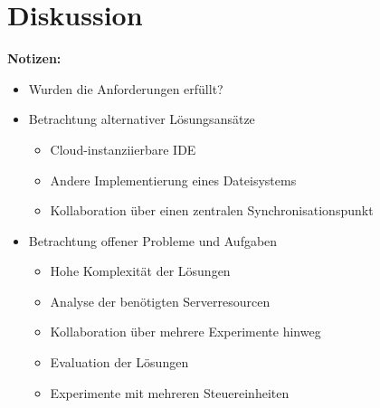 \chapter{Diskussion}\label{section:diskussion}

\begin{note}
    \textbf{Notizen:}
    \begin{itemize}
        \item Wurden die Anforderungen erfüllt?
        \item Betrachtung alternativer Lösungsansätze
              \begin{itemize}
                  \item Cloud-instanziierbare IDE
                  \item Andere Implementierung eines Dateisystems
                  \item Kollaboration über einen zentralen Synchronisationspunkt
              \end{itemize}
        \item Betrachtung offener Probleme und Aufgaben
              \begin{itemize}
                  \item Hohe Komplexität der Lösungen
                  \item Analyse der benötigten Serverresourcen
                  \item Kollaboration über mehrere Experimente hinweg
                  \item Evaluation der Lösungen
                  \item Experimente mit mehreren Steuereinheiten
              \end{itemize}
    \end{itemize}
\end{note}